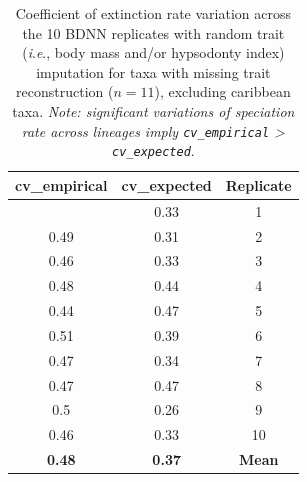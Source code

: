 \documentclass[
  9pt,
  letterpaper,
]{article}
\begin{document}
\begin{longtable}[]{@{}ccc@{}}

\caption{\label{tbl-cv_ex}Coefficient of extinction rate variation
across the 10 BDNN replicates with random trait (\emph{i}.\emph{e}.,
body mass and/or hypsodonty index) imputation for taxa with missing
trait reconstruction (\(n=11\)), excluding caribbean taxa. \emph{Note:
significant variations of speciation rate across lineages imply
\texttt{cv\_empirical} \textgreater{} \texttt{cv\_expected}}.}

\tabularnewline

\toprule\noalign{}
cv\_empirical & cv\_expected & Replicate \\
\midrule\noalign{}
\endhead
\bottomrule\noalign{}
\endlastfoot
0.49 & 0.33 & 1 \\
0.49 & 0.31 & 2 \\
0.46 & 0.33 & 3 \\
0.48 & 0.44 & 4 \\
0.44 & 0.47 & 5 \\
0.51 & 0.39 & 6 \\
0.47 & 0.34 & 7 \\
0.47 & 0.47 & 8 \\
0.5 & 0.26 & 9 \\
0.46 & 0.33 & 10 \\
\textbf{0.48} & \textbf{0.37} & \textbf{Mean} \\

\end{longtable}

\newpage{}
\end{document}
